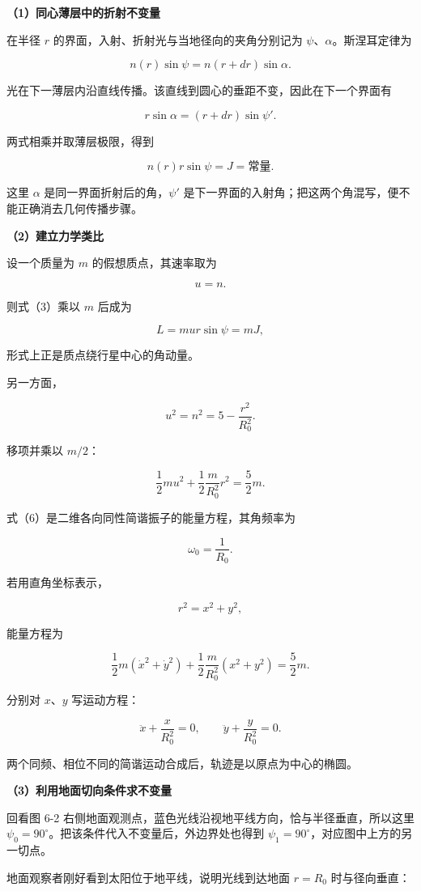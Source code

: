 \documentclass[12pt,a4paper,UTF8]{ctexart}
\begin{document}
\textbf{（1）同心薄层中的折射不变量}

在半径 \(r\) 的界面，入射、折射光与当地径向的夹角分别记为
\(\psi\)、\(\alpha\)。斯涅耳定律为

\[n(r)\sin\psi=n(r+dr)\sin\alpha.\]

光在下一薄层内沿直线传播。该直线到圆心的垂距不变，因此在下一个界面有

\[r\sin\alpha=(r+dr)\sin\psi'.\]

两式相乘并取薄层极限，得到

\[\boxed{n(r)r\sin\psi=J=\text{常量}.}\]

这里 \(\alpha\) 是同一界面折射后的角，\(\psi'\)
是下一界面的入射角；把这两个角混写，便不能正确消去几何传播步骤。

\textbf{（2）建立力学类比}

设一个质量为 \(m\) 的假想质点，其速率取为

\[
u=n.
\tag{4}
\]

则式（3）乘以 \(m\) 后成为

\[
L=mur\sin\psi=mJ,
\tag{5}
\]

形式上正是质点绕行星中心的角动量。

另一方面，

\[
u^2=n^2=5-\frac{r^2}{R_0^2}.
\]

移项并乘以 \(m/2\)：

\[
\frac12mu^2+\frac12\frac{m}{R_0^2}r^2=\frac52m.
\tag{6}
\]

式（6）是二维各向同性简谐振子的能量方程，其角频率为

\[
\omega_0=\frac1{R_0}.
\]

若用直角坐标表示，

\[
r^2=x^2+y^2,
\]

能量方程为

\[
\frac12m(\dot x^2+\dot y^2)
+\frac12\frac{m}{R_0^2}(x^2+y^2)=\frac52m.
\tag{7}
\]

分别对 \(x\)、\(y\) 写运动方程：

\[
\ddot x+\frac{x}{R_0^2}=0,
\qquad
\ddot y+\frac{y}{R_0^2}=0.
\tag{8}
\]

两个同频、相位不同的简谐运动合成后，轨迹是以原点为中心的椭圆。

\textbf{（3）利用地面切向条件求不变量}

回看图 6-2
右侧地面观测点，蓝色光线沿视地平线方向，恰与半径垂直，所以这里
\(\psi_0=90^\circ\)。把该条件代入不变量后，外边界处也得到
\(\psi_1=90^\circ\)，对应图中上方的另一切点。

地面观察者刚好看到太阳位于地平线，说明光线到达地面 \(r=R_0\)
时与径向垂直：
\end{document}
